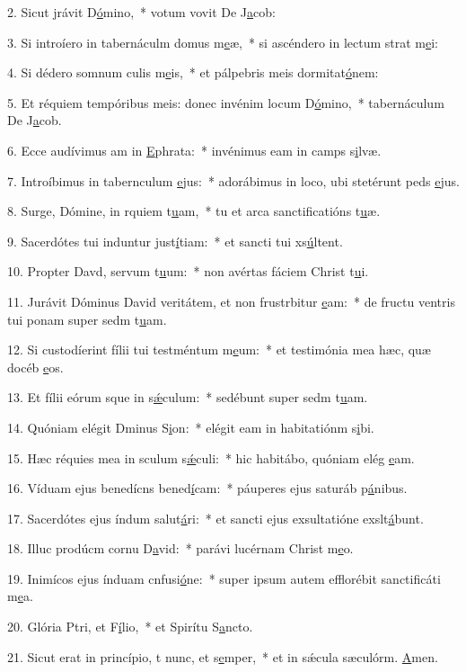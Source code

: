 2. Sicut jrávit D\uline{ó}mino,~* votum vovit De J\uline{a}cob:\par 
3. Si introíero in tabernáculm domus m\uline{e}æ,~* si ascéndero in lectum strat m\uline{e}i:\par 
4. Si dédero somnum culis m\uline{e}is,~* et pálpebris meis dormitat\uline{ó}nem:\par 
5. Et réquiem tempóribus meis: donec invénim locum D\uline{ó}mino,~* tabernáculum De J\uline{a}cob.\par 
6. Ecce audívimus am in \uline{E}phrata:~* invénimus eam in camps s\uline{i}lvæ.\par 
7. Introíbimus in tabernculum \uline{e}jus:~* adorábimus in loco, ubi stetérunt peds \uline{e}jus.\par 
8. Surge, Dómine, in rquiem t\uline{u}am,~* tu et arca sanctificatións t\uline{u}æ.\par 
9. Sacerdótes tui induntur just\uline{í}tiam:~* et sancti tui xs\uline{ú}ltent.\par 
10. Propter Davd, servum t\uline{u}um:~* non avértas fáciem Christ t\uline{u}i.\par 
11. Jurávit Dóminus David veritátem, et non frustrbitur \uline{e}am:~* de fructu ventris tui ponam super sedm t\uline{u}am.\par 
12. Si custodíerint fílii tui testméntum m\uline{e}um:~* et testimónia mea hæc, quæ docéb \uline{e}os.\par 
13. Et fílii eórum sque in s\uline{ǽ}culum:~* sedébunt super sedm t\uline{u}am.\par 
14. Quóniam elégit Dminus S\uline{i}on:~* elégit eam in habitatiónm s\uline{i}bi.\par 
15. Hæc réquies mea in sculum s\uline{ǽ}culi:~* hic habitábo, quóniam elég \uline{e}am.\par 
16. Víduam ejus benedícns bened\uline{í}cam:~* páuperes ejus saturáb p\uline{á}nibus.\par 
17. Sacerdótes ejus índum salut\uline{á}ri:~* et sancti ejus exsultatióne exslt\uline{á}bunt.\par 
18. Illuc prodúcm cornu D\uline{a}vid:~* parávi lucérnam Christ m\uline{e}o.\par 
19. Inimícos ejus índuam cnfusi\uline{ó}ne:~* super ipsum autem efflorébit sanctificáti m\uline{e}a.\par 
20. Glória Ptri, et F\uline{í}lio,~* et Spirítu S\uline{a}ncto.\par 
21. Sicut erat in princípio, t nunc, et s\uline{e}mper,~* et in sǽcula sæculórm. \uline{A}men.\par 
